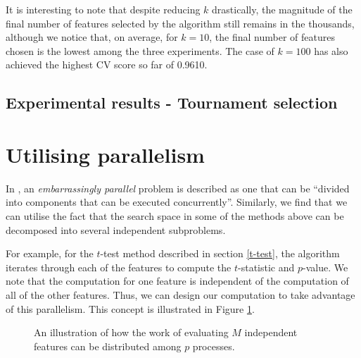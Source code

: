 \documentclass[12pt, twoside, a4paper]{report}
\begin{document}
It is interesting to note that despite reducing $k$ drastically, the magnitude of the final number of features selected by the algorithm still remains in the thousands, although we notice that, on average, for $k=10$, the final number of features chosen is the lowest among the three experiments. The case of $k=100$ has also achieved the highest CV score so far of 0.9610.

\subsection{Experimental results - Tournament selection}

\section{Utilising parallelism} \label{body:parallel}

In \cite{RefWorks:221}, an \textit{embarrassingly parallel} problem is described as one that can be ``divided into components that can be executed concurrently''. Similarly, we find that we can utilise the fact that the search space in some of the methods above can be decomposed into several independent subproblems.

For example, for the $t$-test method described in section \ref{t-test}, the algorithm iterates through each of the features to compute the $t$-statistic and $p$-value. We note that the computation for one feature is independent of the computation of all of the other features. Thus, we can design our computation to take advantage of this parallelism. This concept is illustrated in Figure \ref{body:parallelism_diag}.

\begin{figure}
\centering
{}
\caption{An illustration of how the work of evaluating $M$ independent features can be distributed among $p$ processes.}
\label{body:parallelism_diag}
\end{figure}
\end{document}
